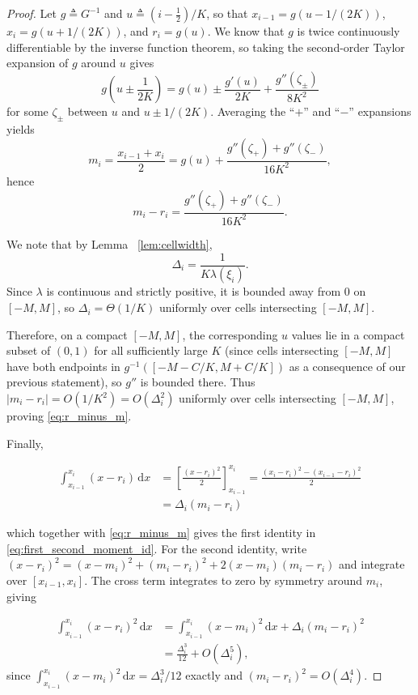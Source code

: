 \documentclass{article}
\newcommand{\abs}[1]{\left\lvert #1 \right\rvert}
\newcommand{\dd}{\,\mathrm{d}}
\newcommand{\defeq}{\triangleq}
\begin{document}
\begin{proof}
Let $g\defeq G^{-1}$ and $u\defeq (i-\tfrac12)/K$, so that $x_{i-1}=g(u-1/(2K))$, $x_i=g(u+1/(2K))$, and $r_i=g(u)$.
We know that $g$ is twice continuously differentiable by the inverse function theorem, so taking the second-order Taylor expansion of $g$ around $u$ gives
\[
g\!\left(u\pm \frac{1}{2K}\right)
= g(u)\pm \frac{g'(u)}{2K}+\frac{g''(\zeta_\pm)}{8K^2}
\]
for some $\zeta_\pm$ between $u$ and $u\pm 1/(2K)$.
Averaging the ``$+$'' and ``$-$'' expansions yields
\[
m_i=\frac{x_{i-1}+x_i}{2}=g(u)+\frac{g''(\zeta_+)+g''(\zeta_-)}{16K^2},
\]
hence
\[
m_i-r_i = \frac{g''(\zeta_+)+g''(\zeta_-)}{16K^2}.
\]

We note that by Lemma ~\ref{lem:cellwidth},
\[
\Delta_i = \frac{1}{K\lambda(\xi_i)}.
\]
Since $\lambda$ is continuous and strictly positive, it is bounded away from $0$ on $[-M,M]$, so $\Delta_i=\Theta(1/K)$ uniformly over cells intersecting $[-M,M]$. 


Therefore, on a compact $[-M,M]$, the corresponding $u$ values lie in a compact subset of $(0,1)$ for all sufficiently large $K$ (since cells intersecting $[-M,M]$ have both endpoints in $g^{-1}([-M - C/K, M + C/K])$ as a consequence of our previous statement), so $g''$ is bounded there. Thus $\abs{m_i-r_i}=O(1/K^2) = O(\Delta_i^2)$ uniformly over cells intersecting $[-M,M]$, proving \eqref{eq:r_minus_m}.

Finally,

\begin{align*}
    \int_{x_{i-1}}^{x_i} (x-r_i)\dd x &=\left[\frac{(x-r_i)^2}{2}\right]_{x_{i-1}}^{x_i}
=\frac{(x_i-r_i)^2-(x_{i-1}-r_i)^2}{2}\\
&=\Delta_i(m_i-r_i)
\end{align*}

which together with \eqref{eq:r_minus_m} gives the first identity in \eqref{eq:first_second_moment_id}.
For the second identity, write $(x-r_i)^2=(x-m_i)^2+(m_i-r_i)^2+2(x-m_i)(m_i-r_i)$ and integrate over $[x_{i-1},x_i]$. The cross term integrates to zero by symmetry around $m_i$, giving

\begin{align*}
    \int_{x_{i-1}}^{x_i} (x-r_i)^2\dd x
&=\int_{x_{i-1}}^{x_i}(x-m_i)^2\dd x + \Delta_i(m_i-r_i)^2\\
&=\frac{\Delta_i^3}{12}+O(\Delta_i^5),
\end{align*}
since $\int_{x_{i-1}}^{x_i}(x-m_i)^2\dd x=\Delta_i^3/12$ exactly and $(m_i-r_i)^2=O(\Delta_i^4)$.
\end{proof}
\end{document}
